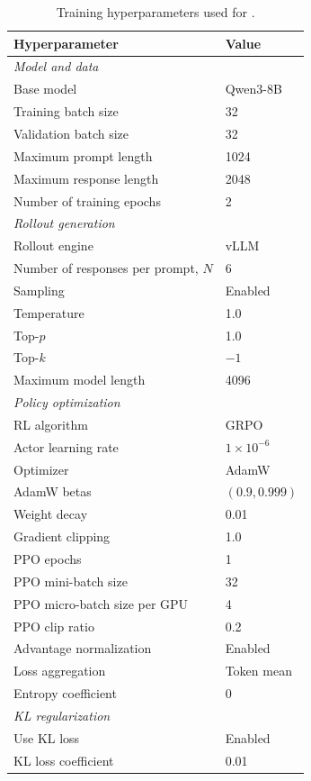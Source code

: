 \begin{table}[t]
\centering
\caption{
Training hyperparameters used for \method{}.
}
\label{tab:training-hyperparams}
\small
\begin{tabular}{ll}
\toprule
\textbf{Hyperparameter} & \textbf{Value} \\
\midrule
\multicolumn{2}{l}{\textit{Model and data}} \\
Base model & Qwen3-8B \\
Training batch size & 32 \\
Validation batch size & 32 \\
Maximum prompt length & 1024 \\
Maximum response length & 2048 \\
Number of training epochs & 2 \\
\midrule
\multicolumn{2}{l}{\textit{Rollout generation}} \\
Rollout engine & vLLM \\
Number of responses per prompt, $N$ & 6 \\
Sampling & Enabled \\
Temperature & 1.0 \\
Top-$p$ & 1.0 \\
Top-$k$ & $-1$ \\
Maximum model length & 4096 \\
\midrule
\multicolumn{2}{l}{\textit{Policy optimization}} \\
RL algorithm & GRPO \\
Actor learning rate & $1\times 10^{-6}$ \\
Optimizer & AdamW \\
AdamW betas & $(0.9, 0.999)$ \\
Weight decay & 0.01 \\
Gradient clipping & 1.0 \\
PPO epochs & 1 \\
PPO mini-batch size & 32 \\
PPO micro-batch size per GPU & 4 \\
PPO clip ratio & 0.2 \\
Advantage normalization & Enabled \\
Loss aggregation & Token mean \\
Entropy coefficient & 0 \\
\midrule
\multicolumn{2}{l}{\textit{KL regularization}} \\
Use KL loss & Enabled \\
KL loss coefficient & 0.01 \\

\end{tabular}
\end{table}
